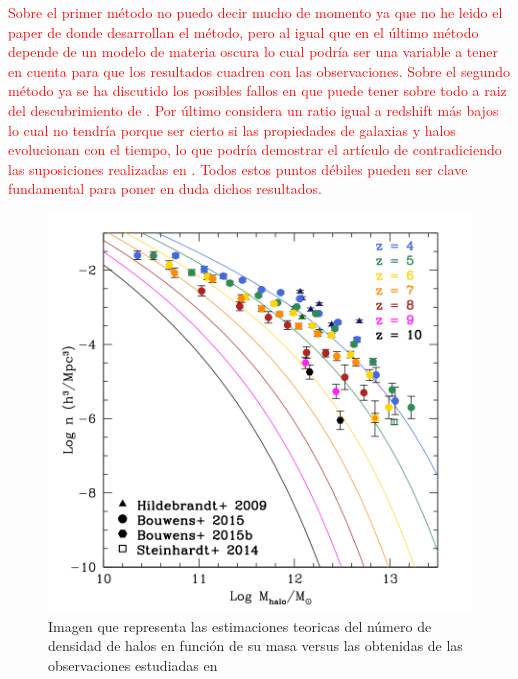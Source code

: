 \documentclass{article}
\begin{document}
\textcolor{red}{Sobre el primer método no puedo decir mucho de momento ya que no he leido el paper de \cite{hildebrandt2009cars} donde desarrollan el método, pero al igual que en el último método depende de un modelo de materia oscura lo cual podría ser una variable a tener en cuenta para que los resultados cuadren con las observaciones. Sobre el segundo método ya se ha discutido los posibles fallos en \cite{arranz2015finkelstein} que puede tener sobre todo a raiz del descubrimiento de \cite{wang2019dominant}. Por último considera un ratio igual a redshift más bajos lo cual no tendría porque ser cierto si las propiedades de galaxias y halos evolucionan con el tiempo, lo que podría demostrar el artículo de \cite{wang2019dominant} contradiciendo las suposiciones realizadas en \cite{finkelstein2015increasing}. Todos estos puntos débiles pueden ser clave fundamental para poner en duda dichos resultados.}\\

\begin{figure}[h]
\begin{center}
\includegraphics[scale=0.55]{Figuras/steindhart_fig1.png}
\caption{\label{fig:steindhart_fig1} Imagen que representa las estimaciones teoricas del número de densidad de halos en función de su masa versus las obtenidas de las observaciones estudiadas en \cite{steinhardt2016impossibly}}
\end{center}
\end{figure}
\end{document}
